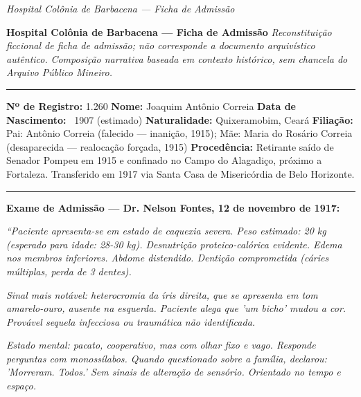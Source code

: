 
\noindent \textit{Hospital Colônia de Barbacena --- Ficha de Admissão}

\noindent \textbf{Hospital Colônia de Barbacena --- Ficha de Admissão}
\textit{Reconstituição ficcional de ficha de admissão; não corresponde a documento arquivístico autêntico.}
\textit{Composição narrativa baseada em contexto histórico, sem chancela do Arquivo Público Mineiro.}

\vspace{0.5em}\noindent\rule{\textwidth}{0.5pt}\vspace{0.5em}

\noindent \textbf{Nº de Registro:} 1.260  
\textbf{Nome:} Joaquim Antônio Correia  
\textbf{Data de Nascimento:} ~1907 (estimado)  
\textbf{Naturalidade:} Quixeramobim, Ceará  
\textbf{Filiação:} Pai: Antônio Correia (falecido --- inanição, 1915); Mãe: Maria do Rosário Correia (desaparecida --- realocação forçada, 1915)  
\textbf{Procedência:} Retirante saído de Senador Pompeu em 1915 e confinado no Campo do Alagadiço, próximo a Fortaleza. Transferido em 1917 via Santa Casa de Misericórdia de Belo Horizonte.

\vspace{0.5em}\noindent\rule{\textwidth}{0.5pt}\vspace{0.5em}

\noindent \textbf{Exame de Admissão --- Dr. Nelson Fontes, 12 de novembro de 1917:}

\noindent \textit{\textquotedblleft{}Paciente apresenta-se em estado de caquexia severa. Peso estimado: 20 kg (esperado para idade: 28-30 kg). Desnutrição proteico-calórica evidente. Edema nos membros inferiores. Abdome distendido. Dentição comprometida (cáries múltiplas, perda de 3 dentes).}

\noindent \textit{Sinal mais notável: heterocromia da íris direita, que se apresenta em tom amarelo-ouro, ausente na esquerda. Paciente alega que 'um bicho' mudou a cor. Provável sequela infecciosa ou traumática não identificada.}

\noindent \textit{Estado mental: pacato, cooperativo, mas com olhar fixo e vago. Responde perguntas com monossílabos. Quando questionado sobre a família, declarou: 'Morreram. Todos.' Sem sinais de alteração de sensório. Orientado no tempo e espaço.}

